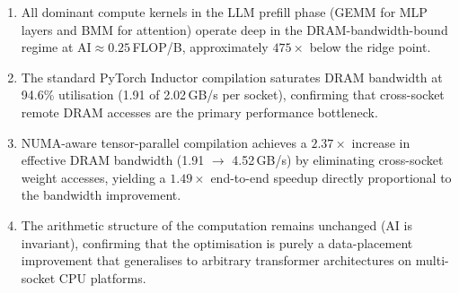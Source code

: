 \begin{enumerate}
  \item All dominant compute kernels in the LLM prefill phase (GEMM for MLP
  layers and BMM for attention) operate deep in the DRAM-bandwidth-bound
  regime at $\text{AI} \approx 0.25$\,FLOP/B, approximately $475\times$
  below the ridge point.

  \item The standard PyTorch Inductor compilation saturates DRAM bandwidth at
  94.6\% utilisation (1.91 of 2.02\,GB/s per socket), confirming that
  cross-socket remote DRAM accesses are the primary performance bottleneck.

  \item NUMA-aware tensor-parallel compilation achieves a $2.37\times$
  increase in effective DRAM bandwidth (1.91 $\rightarrow$ 4.52\,GB/s) by
  eliminating cross-socket weight accesses, yielding a $1.49\times$
  end-to-end speedup directly proportional to the bandwidth improvement.

  \item The arithmetic structure of the computation remains unchanged
  ($\text{AI}$ is invariant), confirming that the optimisation is purely a
  data-placement improvement that generalises to arbitrary transformer
  architectures on multi-socket CPU platforms.
\end{enumerate}
